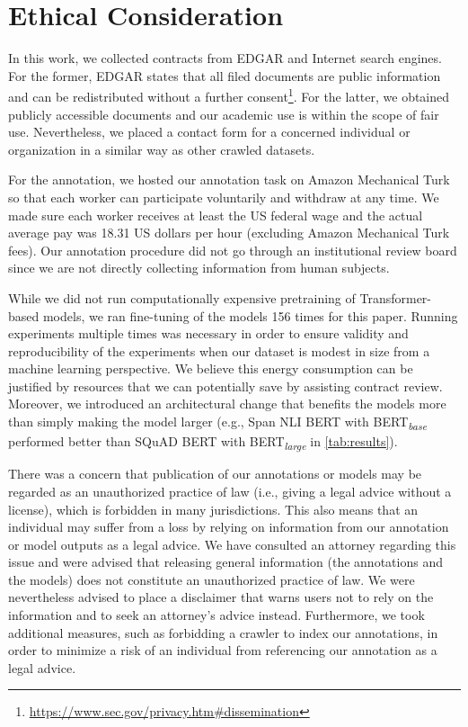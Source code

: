 \section*{Ethical Consideration}

In this work, we collected contracts from EDGAR and Internet search engines.
For the former, EDGAR states that all filed documents are public information and can be redistributed without a further consent\footnote{\url{https://www.sec.gov/privacy.htm\#dissemination}}.
For the latter, we obtained publicly accessible documents and our academic use is within the scope of fair use.
Nevertheless, we placed a contact form for a concerned individual or organization in a similar way as other crawled datasets.

For the annotation, we hosted our annotation task on Amazon Mechanical Turk so that each worker can participate voluntarily and withdraw at any time.
We made sure each worker receives at least the US federal wage and the actual average pay was 18.31 US dollars per hour (excluding Amazon Mechanical Turk fees).
Our annotation procedure did not go through an institutional review board since we are not directly collecting information from human subjects.

While we did not run computationally expensive pretraining of Transformer-based models, we ran fine-tuning of the models 156 times for this paper.
Running experiments multiple times was necessary in order to ensure validity and reproducibility of the experiments when our dataset is modest in size from a machine learning perspective.
We believe this energy consumption can be justified by resources that we can potentially save by assisting contract review.
Moreover, we introduced an architectural change that benefits the models more than simply making the model larger (e.g., Span NLI BERT with BERT\textsubscript{\textit{base}} performed better than SQuAD BERT with BERT\textsubscript{\textit{large}} in \cref{tab:results}).

There was a concern that publication of our annotations or models may be regarded as an unauthorized practice of law (i.e., giving a legal advice without a license), which is forbidden in many jurisdictions.
This also means that an individual may suffer from a loss by relying on information from our annotation or model outputs as a legal advice.
We have consulted an attorney regarding this issue and were advised that releasing general information (the annotations and the models) does not constitute an unauthorized practice of law.
We were nevertheless advised to place a disclaimer that warns users not to rely on the information and to seek an attorney's advice instead.
Furthermore, we took additional measures, such as forbidding a crawler to index our annotations, in order to minimize a risk of an individual from referencing our annotation as a legal advice.
